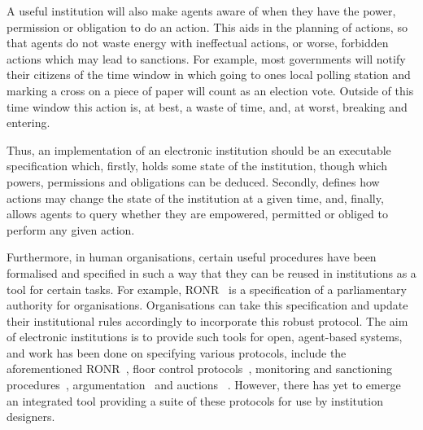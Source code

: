 
A useful institution will also make agents aware of when they have the power,
permission or obligation to do an action. This aids in the planning of actions,
so that agents do not waste energy with ineffectual actions, or worse, forbidden
actions which may lead to sanctions. For example, most governments will notify
their citizens of the time window in which going to ones local polling station
and marking a cross on a piece of paper will count as an election vote. Outside
of this time window this action is, at best, a waste of time, and, at worst,
breaking and entering.

Thus, an implementation of an electronic institution should be an executable
specification which, firstly, holds some state of the institution, though which
powers, permissions and obligations can be deduced. Secondly, defines how
actions may change the state of the institution at a given time, and, finally,
allows agents to query whether they are empowered, permitted or obliged to perform
any given action.

Furthermore, in human organisations, certain useful procedures have been
formalised and specified in such a way that they can be reused in institutions
as a tool for certain tasks. For example, \ac{RONR}~\citep{Robert2011} is a
specification of a parliamentary authority for organisations. Organisations
can take this specification and update their institutional rules accordingly
to incorporate this robust protocol. The aim of electronic institutions is to
provide such tools for open, agent-based systems, and work has been done on
specifying various protocols, include the aforementioned
\ac{RONR}~\citep{Pitt2005a}, floor control
protocols~\citep{Artikis2004,Artikis2009b}, monitoring and sanctioning
procedures~\citep{Pitt2012c}, argumentation~\citep{Artikis2003} and auctions~
\citep{Rodriguez1997}. However, there has yet to emerge an integrated tool
providing a suite of these protocols for use by institution designers.

